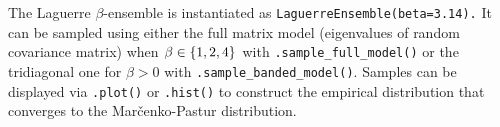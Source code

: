 \documentclass[twoside,11pt]{article}
\begin{document}
    The Laguerre $\beta$-ensemble is instantiated as
    \lstinline{LaguerreEnsemble(beta=3.14).}
    It can be sampled using either the full matrix model (eigenvalues of random covariance matrix) when $\beta\in\left\{ 1,2,4 \right\}$ with
    \lstinline{.sample_full_model()}
    or the tridiagonal one for $\beta > 0$ with
    \lstinline{.sample_banded_model()}.
    Samples can be displayed via
    \lstinline{.plot()} or
    \lstinline{.hist()} to construct the empirical distribution that converges to the Mar\v{c}enko-Pastur distribution.

    \begin{figure}[!hb]
        \centering
\end{figure}
\end{document}

